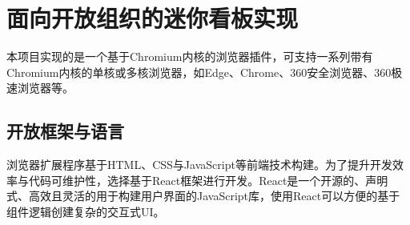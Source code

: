 \section{面向开放组织的迷你看板实现}
\par 本项目实现的是一个基于Chromium内核的浏览器插件，可支持一系列带有Chromium内核的单核或多核浏览器，如Edge、Chrome、360安全浏览器、360极速浏览器等。

\subsection{开放框架与语言}
\par 浏览器扩展程序基于HTML、CSS与JavaScript等前端技术构建。为了提升开发效率与代码可维护性，选择基于React框架进行开发。React是一个开源的、声明式、高效且灵活的用于构建用户界面的JavaScript库，使用React可以方便的基于组件逻辑创建复杂的交互式UI。

